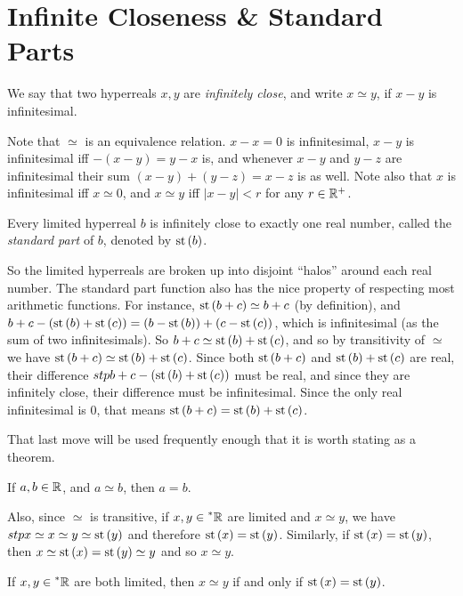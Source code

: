 \section{Infinite Closeness \& Standard Parts}
\begin{defn}
    We say that two hyperreals $x, y$ are \textit{infinitely close}, and write $x \simeq y$, if $x - y$ is infinitesimal.
\end{defn}

Note that $\simeq$ is an equivalence relation. $x - x = 0$ is infinitesimal, $x - y$ is infinitesimal iff $-(x - y) = y - x$ is, and whenever $x - y$ and $y - z$ are infinitesimal their sum $(x - y) + (y - z) = x - z$ is as well. Note also that $x$ is infinitesimal iff $x \simeq 0$, and $x \simeq y$ iff $|x - y| < r$ for any $r \in \mathbb{R}^+$.

\begin{thm}
    Every limited hyperreal $b$ is infinitely close to exactly one real number, called the \textit{standard part} of $b$, denoted by $\operatorname{st}\left(b\right)$.
\end{thm}

So the limited hyperreals are broken up into disjoint ``halos'' around each real number. The standard part function also has the nice property of respecting most arithmetic functions. For instance, $\operatorname{st}\left(b + c\right) \simeq b + c$ (by definition), and $b + c - (\operatorname{st}\left(b\right) + \operatorname{st}\left(c\right)) = (b - \operatorname{st}\left(b\right)) + (c - \operatorname{st}\left(c\right))$, which is infinitesimal (as the sum of two infinitesimals). So $b + c \simeq \operatorname{st}\left(b\right) + \operatorname{st}\left(c\right)$, and so by transitivity of $\simeq$ we have $\operatorname{st}\left(b + c\right) \simeq \operatorname{st}\left(b\right) + \operatorname{st}\left(c\right)$. Since both $\operatorname{st}\left(b + c\right)$ and $\operatorname{st}\left(b\right) + \operatorname{st}\left(c\right)$ are real, their difference $stp{b + c} - (\operatorname{st}\left(b\right) + \operatorname{st}\left(c\right))$ must be real, and since they are infinitely close, their difference must be infinitesimal. Since the only real infinitesimal is $0$, that means $\operatorname{st}\left(b+c\right) = \operatorname{st}\left(b\right)+\operatorname{st}\left(c\right)$.

That last move will be used frequently enough that it is worth stating as a theorem.
\begin{thm}
    If $a, b \in \mathbb{R}$, and $a \simeq b$, then $a = b$.
\end{thm}

Also, since $\simeq$ is transitive, if $x, y \in \prescript{*}{}{\mathbb{R}}$ are limited and $x \simeq y$, we have $stp{x} \simeq x \simeq y \simeq \operatorname{st}\left(y\right)$ and therefore $\operatorname{st}\left(x\right) = \operatorname{st}\left(y\right)$. Similarly, if $\operatorname{st}\left(x\right) = \operatorname{st}\left(y\right)$, then $x \simeq \operatorname{st}\left(x\right) = \operatorname{st}\left(y\right) \simeq y$ and so $x \simeq y$.
\begin{corollary}
    If $x, y \in \prescript{*}{}{\mathbb{R}}$ are both limited, then $x \simeq y$ if and only if $\operatorname{st}\left(x\right) = \operatorname{st}\left(y\right)$.
\end{corollary}

